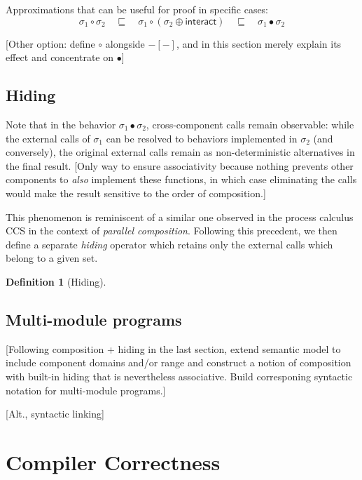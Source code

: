 \documentclass{article}
\newtheorem{definition}{Definition}
\newcommand{\kw}[1]{\ensuremath{ \mathsf{#1} }}
\begin{document}
Approximations that can be useful for proof in specific cases:
\[
    \sigma_1 \circ \sigma_2 \quad \sqsubseteq \quad
    \sigma_1 \circ (\sigma_2 \oplus \kw{interact}) \quad \sqsubseteq \quad
    \sigma_1 \bullet \sigma_2
\]

[Other option:
define $\circ$ alongside $-[-]$, and
in this section merely explain its effect and concentrate on $\bullet$]


\subsection{Hiding} %

Note that
in the behavior $\sigma_1 \bullet \sigma_2$,
cross-component calls remain observable:
while the external calls of $\sigma_1$
can be resolved to behaviors implemented in $\sigma_2$
(and conversely),
the original external calls remain
as non-deterministic alternatives in the final result.
[Only way to ensure associativity
because nothing prevents other components
to \emph{also} implement these functions,
in which case eliminating the calls
would make the result sensitive to the order of composition.]

This phenomenon is reminiscent of a similar one observed
in the process calculus CCS \cite{ccs}
in the context of \emph{parallel composition}.
Following this precedent,
we then define a separate \emph{hiding} operator
which retains only the external calls
which belong to a given set.

\begin{definition}[Hiding]

\end{definition}


\subsection{Multi-module programs} %

[Following composition + hiding in the last section,
extend semantic model to include component domains and/or range
and construct a notion of composition with built-in hiding
that is nevertheless associative.
Build corresponing syntactic notation
for multi-module programs.]

[Alt., syntactic linking]



\section{Compiler Correctness} %
\end{document}
